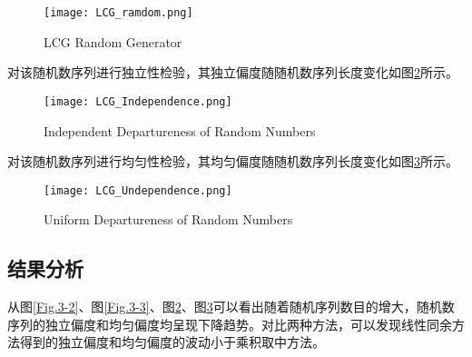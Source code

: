 \documentclass[a4paper,12pt]{ctexart}
\begin{document}
\begin{figure}[hb] %
\centering %
\texttt{[image: LCG\_ramdom.png]} %
\caption{LCG Random Generator} %
\label{Fig.3-4} %
\end{figure}

对该随机数序列进行独立性检验，其独立偏度随随机数序列长度变化如图\ref{Fig.3-5}所示。

\begin{figure}[H] %
\centering %
\texttt{[image: LCG\_Independence.png]} %
\caption{Independent Departureness of Random Numbers} %
\label{Fig.3-5} %
\end{figure}

对该随机数序列进行均匀性检验，其均匀偏度随随机数序列长度变化如图\ref{Fig.3-6}所示。

\begin{figure}[H] %
\centering %
\texttt{[image: LCG\_Undependence.png]} %
\caption{Uniform Departureness of Random Numbers} %
\label{Fig.3-6} %
\end{figure}

\subsection{结果分析}
从图\ref{Fig.3-2}、图\ref{Fig.3-3}、图\ref{Fig.3-5}、图\ref{Fig.3-6}可以看出随着随机序列数目的增大，随机数序列的独立偏度和均匀偏度均呈现下降趋势。对比两种方法，可以发现线性同余方法得到的独立偏度和均匀偏度的波动小于乘积取中方法。
\end{document}
